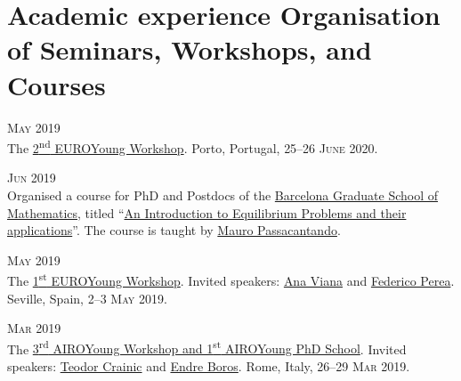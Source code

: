 \section*{Academic experience {\small Organisation of Seminars, Workshops, and Courses}}

\begin{paracol}{2}
  \textsc{May 2019}
\switchcolumn
  \\
  The \href{https://euroyoung.github.io/workshop20.html}{2\textsuperscript{nd} EUROYoung Workshop}.
  Porto, Portugal, \textsc{25--26 June 2020}.
\end{paracol}

\begin{paracol}{2}
  \textsc{Jun 2019}
\switchcolumn
  \\
  Organised a course for PhD and Postdocs of the \href{https://www.bgsmath.cat/}{Barcelona Graduate School of Mathematics}, titled ``\href{https://web.archive.org/web/20190115064545/https://bgsmath.cat/event/introduction-equilibrium-problems-applications/}{An Introduction to Equilibrium Problems and their applications}''.
  The course is taught by \href{https://scholar.google.com/citations?user=GEtI8UUAAAAJ}{Mauro Passacantando}.
\end{paracol}

\begin{paracol}{2}
  \textsc{May 2019}
\switchcolumn
  \\
  The \href{https://euroyoung.github.io/workshop19.html}{1\textsuperscript{st} EUROYoung Workshop}.
  Invited speakers: \href{https://scholar.google.it/citations?user=RW7QevYAAAAJ}{Ana Viana} and \href{https://scholar.google.com/citations?user=DzigbIgAAAAJ}{Federico Perea}.
  Seville, Spain, \textsc{2--3 May 2019}.
\end{paracol}

\begin{paracol}{2}
  \textsc{Mar 2019}
\switchcolumn
  \\
  The \href{https://workshop.airoyoung.org/2019}{3\textsuperscript{rd} AIROYoung Workshop and 1\textsuperscript{st} AIROYoung PhD School}.
  Invited speakers: \href{https://scholar.google.it/citations?user=C_zcTIAAAAAJ}{Teodor Crainic} and \href{https://scholar.google.it/citations?user=ok_1EXwAAAAJ}{Endre Boros}.
  Rome, Italy, \textsc{26--29 Mar 2019}.
\end{paracol}

